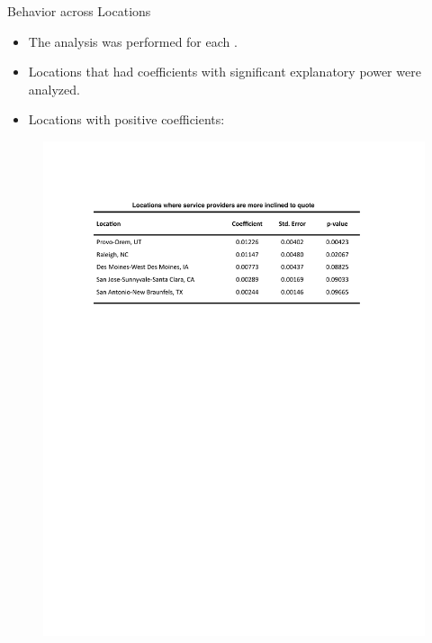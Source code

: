 \documentclass{beamer}
\begin{document}
\begin{frame}{Behavior across Locations}{}
	\vspace{-0. in}
	\begin{itemize}
		\item {The analysis was performed for each {\color{blue}{Location}}.}\newline
		\item{Locations that had coefficients with significant explanatory power were analyzed.}\newline
		\item {Locations with positive coefficients:}\newline 
	\end{itemize}
		\vspace{-0.6 in}
	\begin{figure}{}
		\vspace*{-0 in}
		\scalebox{1}
		{\hspace*{-0 in}\includegraphics[scale=0.7]{coef_loc_more.pdf} }
	\end{figure}	
	\vspace*{-0 in}
\end{frame}
\end{document}
